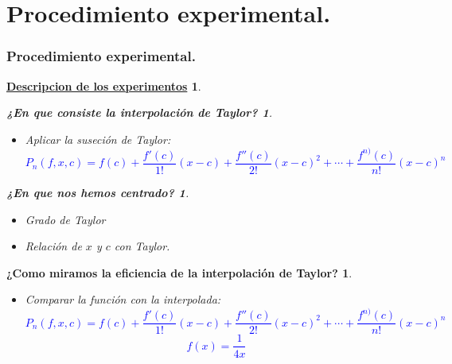 \documentclass{beamer}
\newtheorem{procedimiento}{¿En que nos hemos centrado?}
\newtheorem{forma}{¿Como miramos la eficiencia de la interpolación de Taylor?}
\newtheorem{idea}{¿En que consiste la interpolación de Taylor?}
\newtheorem{descripcion de los experimentos}{\underline {Descripcion de los experimentos}}
\begin{document}
\section{Procedimiento experimental.}
\begin{frame}
\frametitle{Procedimiento experimental.}
\begin {descripcion de los experimentos}
\begin{idea}
\pause
\begin {itemize}
\item Aplicar la suseción de Taylor:
\textcolor{blue}{$$P_n(f,x,c)=f(c)+\frac{f'(c)}{1!}(x-c)+\frac{f''(c)}{2!}(x-c)^2+ \cdots +\frac{f^{n)}(c)}{n!}(x-c)^n$$}
\end {itemize}
\pause
\end {idea}
\begin{procedimiento}
\begin {itemize}
\item Grado de Taylor
\item Relación de $x$ y $c$ con Taylor.
\end {itemize}
\end {procedimiento}
\end{descripcion de los experimentos}
\end{frame}


\begin{frame}
\begin{forma}
\pause
\begin {itemize}
\item Comparar la función con la interpolada:
\textcolor{blue}{$$P_n(f,x,c)=f(c)+\frac{f'(c)}{1!}(x-c)+\frac{f''(c)}{2!}(x-c)^2+ \cdots +\frac{f^{n)}(c)}{n!}(x-c)^n$$
$$f(x)= \frac{1}{4x}$$}
\end {itemize}
\end {forma}
\end {frame}
\end{document}
